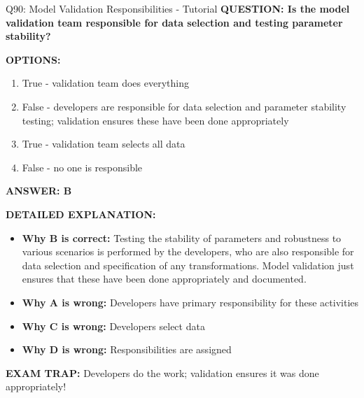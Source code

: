 \documentclass[8pt]{beamer}
\begin{document}
	\begin{frame}{Q90: Model Validation Responsibilities - Tutorial}
		\fontsize{6.5}{7.5}\selectfont
		\textbf{QUESTION: Is the model validation team responsible for data selection and testing parameter stability?}
		
		\vspace{0.1cm}
		\textbf{OPTIONS:}
		\begin{enumerate}
			\item True - validation team does everything
			\item False - developers are responsible for data selection and parameter stability testing; validation ensures these have been done appropriately
			\item True - validation team selects all data
			\item False - no one is responsible
		\end{enumerate}
		
		\vspace{0.1cm}
		\textcolor{myblue}{\textbf{ANSWER: B}}
		
		\vspace{0.1cm}
		\textbf{DETAILED EXPLANATION:}
		\begin{itemize}
			\item \textbf{Why B is correct:} Testing the stability of parameters and robustness to various scenarios is performed by the developers, who are also responsible for data selection and specification of any transformations. Model validation just ensures that these have been done appropriately and documented.
			\item \textbf{Why A is wrong:} Developers have primary responsibility for these activities
			\item \textbf{Why C is wrong:} Developers select data
			\item \textbf{Why D is wrong:} Responsibilities are assigned
		\end{itemize}
		
		\textcolor{myred}{\textbf{EXAM TRAP:}} Developers do the work; validation \textcolor{myblue}{ensures it was done appropriately}!
	\end{frame}
	
\end{document}
